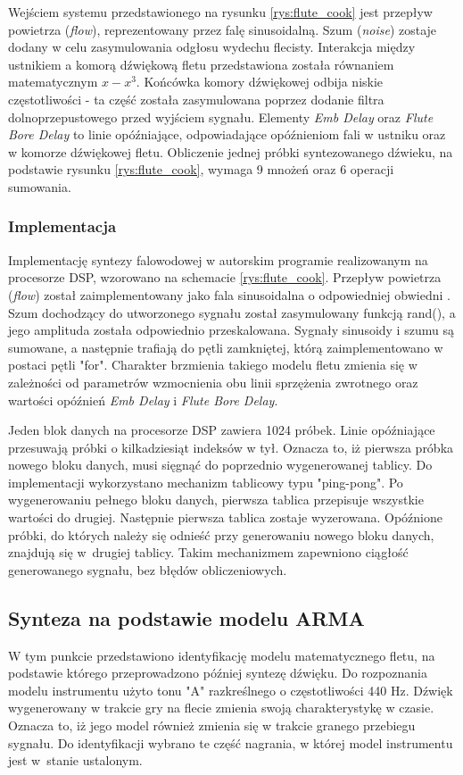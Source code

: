 Wejściem systemu przedstawionego na rysunku \ref{rys:flute_cook} jest przepływ powietrza (\emph{flow}), reprezentowany przez falę sinusoidalną. Szum (\emph{noise}) zostaje dodany w celu zasymulowania odgłosu wydechu flecisty. 
Interakcja między ustnikiem a komorą dźwiękową fletu przedstawiona została równaniem matematycznym $x-x^3$. Końcówka komory dźwiękowej odbija niskie częstotliwości - ta część została zasymulowana poprzez dodanie filtra dolnoprzepustowego przed wyjściem sygnału. Elementy \emph{Emb Delay} oraz \emph{Flute Bore Delay} to linie opóźniające, odpowiadające opóźnieniom fali w ustniku oraz w komorze dźwiękowej fletu. 
Obliczenie jednej próbki syntezowanego dźwieku, na podstawie rysunku \ref{rys:flute_cook}, wymaga 9 mnożeń oraz 6 operacji sumowania.

\subsubsection{Implementacja}
Implementację syntezy falowodowej w autorskim programie realizowanym na procesorze DSP,  wzorowano na schemacie \ref{rys:flute_cook}. Przepływ powietrza (\emph{flow}) został zaimplementowany jako fala sinusoidalna o odpowiedniej obwiedni \cite{flute_prezka}. Szum dochodzący do utworzonego sygnału został zasymulowany funkcją rand(), a jego amplituda została odpowiednio przeskalowana. Sygnały sinusoidy i szumu są sumowane, a następnie trafiają do pętli zamkniętej, którą zaimplementowano w postaci pętli "for". Charakter brzmienia takiego modelu fletu zmienia się w zależności od parametrów wzmocnienia obu linii sprzężenia zwrotnego oraz wartości opóźnień \emph{Emb Delay} i \emph{Flute Bore Delay}.

Jeden blok danych na procesorze DSP zawiera 1024 próbek. Linie opóźniające przesuwają próbki o kilkadziesiąt indeksów w tył. Oznacza to, iż pierwsza próbka nowego bloku danych, musi sięgnąć do poprzednio wygenerowanej tablicy. Do implementacji wykorzystano mechanizm tablicowy typu "ping-pong". Po wygenerowaniu pełnego bloku danych, pierwsza tablica przepisuje wszystkie wartości do drugiej. Następnie pierwsza tablica zostaje wyzerowana. Opóźnione próbki, do których należy się odnieść przy generowaniu nowego bloku danych, znajdują się w~drugiej tablicy. Takim mechanizmem zapewniono ciągłość generowanego sygnału, bez błędów obliczeniowych.

\subsection{Synteza na podstawie modelu ARMA}
W tym punkcie przedstawiono identyfikację modelu matematycznego fletu, na podstawie którego przeprowadzono później syntezę dźwięku. Do rozpoznania modelu instrumentu użyto tonu "A" razkreślnego o częstotliwości 440 Hz. Dźwięk wygenerowany w trakcie gry na flecie zmienia swoją charakterystykę w czasie. Oznacza to, iż jego model również zmienia się w trakcie granego przebiegu sygnału. Do identyfikacji wybrano te część nagrania, w której model instrumentu jest w~stanie ustalonym.

